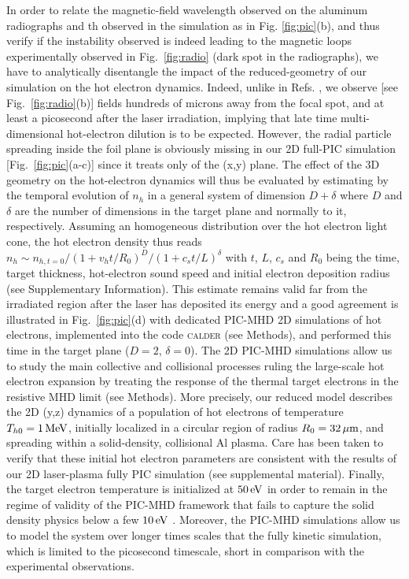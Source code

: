 \documentclass[aps,twocolumn,showpacs,superscriptaddress]{revtex4}
\begin{document}
In order to relate the magnetic-field wavelength observed on the aluminum radiographs and th observed  in the simulation as in Fig. \ref{fig:pic}(b), and thus verify if the instability observed is indeed leading to the magnetic loops experimentally observed in Fig.~\ref{fig:radio} (dark spot in the radiographs), we have to analytically disentangle the impact of the  reduced-geometry of our simulation on the hot electron dynamics. 
Indeed, unlike in Refs. \cite{PRL_Gode_2017,NJP_Scott_2017}, we observe [see Fig.~\ref{fig:radio}(b)] fields hundreds of microns away from the focal spot, and at least a picosecond after the laser irradiation, implying that late time multi-dimensional hot-electron dilution is to be expected. 
However, the radial particle spreading inside  the foil plane is obviously missing in our 2D full-PIC simulation [Fig.~\ref{fig:pic}(a-c)] since it treats only of the (x,y) plane. The effect of the 3D geometry on the hot-electron dynamics will thus be evaluated by estimating by the   temporal evolution  of $n_h$ in a general system of dimension $D+\delta$ where $D$ and $\delta$ are the number of dimensions in the target plane and normally to it, respectively.
Assuming an homogeneous distribution over the hot electron light cone, the hot electron density thus reads $n_{h}\sim n_{h,  t=0} /(1+ v_h t /R_0)^D/(1+c_s t/L)^\delta $ with $t$, $L$, $c_s$ and $R_0$ being the time, target thickness, hot-electron sound speed and initial electron deposition radius (see Supplementary Information). 
This estimate remains valid far from the irradiated region after the laser has deposited its energy and  a good agreement is illustrated in Fig.~\ref{fig:pic}(d)   with dedicated PIC-MHD 2D simulations of hot electrons, implemented into the code \textsc{calder} (see Methods), and performed this time in the target plane ($D=2$, $\delta=0$).
The 2D PIC-MHD simulations allow us to study the main collective and collisional processes ruling the large-scale hot electron expansion by treating the response of the thermal target electrons in the resistive MHD limit (see Methods). More precisely, our reduced model describes the 2D (y,z) dynamics of a population of hot electrons of temperature $T_{h0}=1 \,\rm MeV$, initially localized in a circular region of radius $R_0=32\,\rm \mu m$, and spreading within a solid-density, collisional Al plasma. 
Care has been taken to verify that these initial hot electron parameters are consistent with the results of our 2D laser-plasma fully PIC simulation (see supplemental material). Finally, the target electron temperature is initialized at $50\,\rm eV$ in order to remain in  the regime of validity of the PIC-MHD framework that  fails to capture the solid  density physics below a few $10\,\rm eV$ \cite{POP_Perez_2012}. Moreover, the PIC-MHD simulations allow us to model the system over longer times scales that the fully kinetic simulation, which is limited to the picosecond timescale, short in comparison with the experimental observations.
\end{document}
